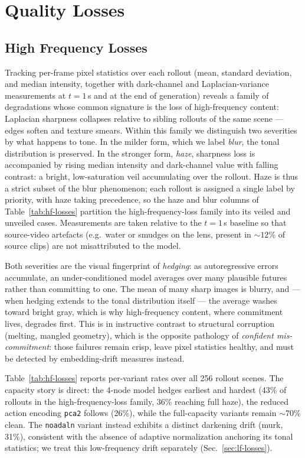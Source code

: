 \section{Quality Losses}

\subsection{High Frequency Losses}

Tracking per-frame pixel statistics over each rollout (mean, standard deviation, and median intensity, together with dark-channel and Laplacian-variance measurements at $t{=}1$\,s and at the end of generation) reveals a family of degradations whose common signature is the loss of high-frequency content: Laplacian sharpness collapses relative to sibling rollouts of the same scene --- edges soften and texture smears. Within this family we distinguish two severities by what happens to tone. In the milder form, which we label \textit{blur}, the tonal distribution is preserved. In the stronger form, \textit{haze}, sharpness loss is accompanied by rising median intensity and dark-channel value with falling contrast: a bright, low-saturation veil accumulating over the rollout. Haze is thus a strict subset of the blur phenomenon; each rollout is assigned a single label by priority, with haze taking precedence, so the haze and blur columns of Table~\ref{tab:hf-losses} partition the high-frequency-loss family into its veiled and unveiled cases. Measurements are taken relative to the $t{=}1$\,s baseline so that source-video artefacts (e.g.\ water or smudges on the lens, present in ${\sim}12\%$ of source clips) are not misattributed to the model.

Both severities are the visual fingerprint of \emph{hedging}: as autoregressive errors accumulate, an under-conditioned model averages over many plausible futures rather than committing to one. The mean of many sharp images is blurry, and --- when hedging extends to the tonal distribution itself --- the average washes toward bright gray, which is why high-frequency content, where commitment lives, degrades first. This is in instructive contrast to structural corruption (melting, mangled geometry), which is the opposite pathology of \emph{confident mis-commitment}: those failures remain crisp, leave pixel statistics healthy, and must be detected by embedding-drift measures instead.

Table~\ref{tab:hf-losses} reports per-variant rates over all 256 rollout scenes. The capacity story is direct: the 4-node model hedges earliest and hardest (43\% of rollouts in the high-frequency-loss family, 36\% reaching full haze), the reduced action encoding \texttt{pca2} follows (26\%), while the full-capacity variants remain ${\sim}70\%$ clean. The \texttt{noadaln} variant instead exhibits a distinct darkening drift (murk, 31\%), consistent with the absence of adaptive normalization anchoring its tonal statistics; we treat this low-frequency drift separately (Sec.~\ref{sec:lf-losses}).

